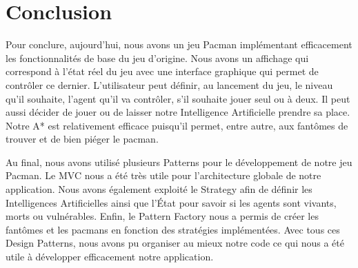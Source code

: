 \documentclass[a4paper, 11pt]{article}
\begin{document}
\part*{Conclusion}

Pour conclure, aujourd'hui, nous avons un jeu Pacman implémentant efficacement les fonctionnalités de base du jeu d'origine. Nous avons un affichage qui correspond
à l'état réel du jeu avec une interface graphique qui permet de contrôler ce dernier. L'utilisateur peut définir, au lancement du jeu, le niveau qu'il souhaite, 
l'agent qu'il va contrôler, s'il souhaite jouer seul ou à deux. Il peut aussi décider de jouer ou de laisser notre Intelligence Artificielle prendre sa place.
Notre A* est relativement efficace puisqu'il permet, entre autre, aux fantômes de trouver et de bien piéger le pacman.

Au final, nous avons utilisé plusieurs Patterns pour le développement de notre jeu Pacman. Le MVC nous a été très utile pour l'architecture globale
de notre application. Nous avons également exploité le Strategy afin de définir les Intelligences Artificielles ainsi que l'État pour savoir si les agents 
sont vivants, morts ou vulnérables. Enfin, le Pattern Factory nous a permis de créer les fantômes et les pacmans en fonction des stratégies implémentées. 
Avec tous ces Design Patterns, nous avons pu organiser au mieux notre code ce qui nous a été utile à développer efficacement notre application.
\end{document}
